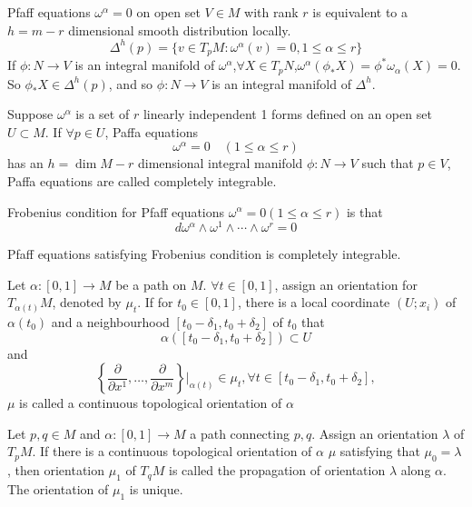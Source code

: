 \begin{newprop}
Pfaff equations $\omega^{\alpha} = 0$ on open set $V \in M$ with rank $r$ is equivalent to a $h=m-r$ dimensional smooth distribution locally.
\[\Delta^h(p) = \{v \in T_pM:\omega^{\alpha}(v)=0,1 \le \alpha \le r \}\]
If $\phi:N \to V$ is an integral manifold of $\omega^{\alpha}$,$\forall X \in T_pN$,$\omega^{\alpha}(\phi_{*}X) = \phi^* \omega_{\alpha}(X) =0$. So $\phi_* X \in \Delta^h(p)$, and so $\phi:N \to V$ is an integral manifold of $\Delta^h$.
\end{newprop}

\begin{newdef}
Suppose $\omega^{\alpha}$ is a set of $r$ linearly independent 1 forms defined on an open set $U \subset M$. If $\forall p \in U$,  Paffa equations
\[\omega^{\alpha} = 0 \quad (1 \leq \alpha \leq r)\]
has an $h = \dim M -r$ dimensional integral manifold $\phi: N \to V$ such that $p \in V$, Paffa equations are called completely integrable.
\end{newdef}     

\begin{newdef}
Frobenius condition for Pfaff equations $\omega^{\alpha} =0(1 \le \alpha \le r)$ is that
\[d\omega^{\alpha} \wedge \omega^1 \wedge \cdots \wedge \omega^r = 0\]
\end{newdef}

\begin{newthem}
Pfaff equations satisfying Frobenius condition is completely integrable.
\end{newthem}

\begin{newdef}
Let $\alpha:[0,1] \to M$ be a path on $M$. $\forall t \in [0,1]$, assign an orientation for $T_{\alpha(t)}M$, denoted by $\mu_t$. If for $t_0 \in [0,1]$, there is a local coordinate $(U;x_i)$ of $\alpha(t_0)$ and a neighbourhood $[t_0-\delta_1,t_0+\delta_2]$ of $t_0$ that
\[\alpha([t_0-\delta_1,t_0+\delta_2]) \subset U\] 
and
\[\left\{ \frac{\partial}{\partial x^1},\ldots,\frac{\partial}{\partial x^m}\right\}|_{\alpha(t)} \in \mu_t,\forall t \in [t_0-\delta_1,t_0+\delta_2],\] 
$\mu$ is called a continuous topological orientation of $\alpha$
\end{newdef}

\begin{newdef}
Let $p,q \in M$ and $\alpha:[0,1] \to M$ a path connecting $p,q$. Assign an orientation $\lambda$ of $T_pM$. If there is a continuous topological orientation of $\alpha$ $\mu$ satisfying that $\mu_0 = \lambda$, then orientation $\mu_1$ of $T_qM$ is called the propagation of orientation $\lambda$ along $\alpha$. The orientation of $\mu_1$ is unique.
\end{newdef}

